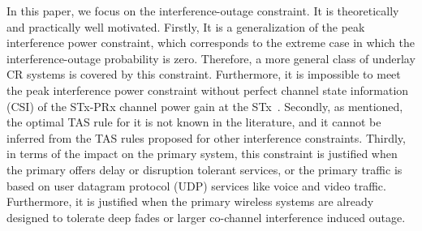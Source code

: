 \documentclass[12pt,draftcls,peerreview,onecolumn]{IEEEtran}
\begin{document}
In this paper, we focus on the interference-outage constraint. It is theoretically and practically well motivated.  Firstly, It is a generalization of the peak interference power constraint, which corresponds to the extreme case in which the interference-outage probability is zero. Therefore, a more general class of underlay CR systems is covered by this constraint. Furthermore, it is impossible to meet the peak interference power constraint without perfect channel state information (CSI) of the STx-PRx channel power gain at the STx~\cite{musavian_2009_tcom,Suraweera_2010_TVT,Peng_2016_eurasip}. Secondly, as mentioned, the optimal TAS rule for it is not known in the literature, and it cannot be inferred from the TAS rules proposed for other interference constraints. Thirdly, in terms of the impact on the primary system, this constraint is justified when the primary offers delay or disruption tolerant services, or the primary traffic is based on user datagram protocol (UDP) services like voice and video traffic. Furthermore, it is justified when the primary wireless systems are already designed to tolerate deep fades or larger co-channel interference induced outage. 
\end{document}
